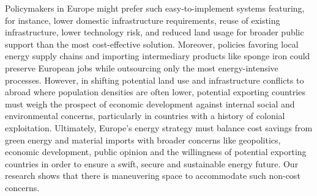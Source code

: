 Policymakers in Europe might prefer such easy-to-implement systems featuring,
for instance, lower domestic infrastructure requirements, reuse of existing
infrastructure, lower technology risk, and reduced land usage for broader public
support than the most cost-effective solution. Moreover, policies favoring local
energy supply chains and importing intermediary products like sponge iron could
preserve European jobs while outsourcing only the most energy-intensive
processes. However, in shifting potential land use and infrastructure conflicts
to abroad where population densities are often lower, potential exporting
countries must weigh the prospect of economic development against internal
social and environmental concerns, particularly in countries with a history of
colonial exploitation.\cite{tunnGreenHydrogenTransitions2024} Ultimately,
Europe's energy strategy must balance cost savings from green energy and
material imports with broader concerns like geopolitics, economic development,
public opinion and the willingness of potential exporting countries in order to
ensure a swift, secure and sustainable energy future. Our research shows that
there is maneuvering space to accommodate such non-cost concerns.
